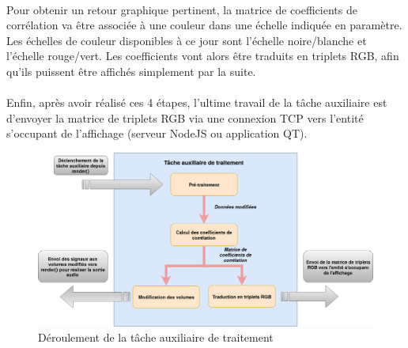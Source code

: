 \paragraph{}
Pour obtenir un retour graphique pertinent, la matrice de coefficients de corrélation va être associée à une couleur dans une échelle indiquée en paramètre. Les échelles de couleur disponibles à ce jour sont l'échelle noire/blanche et l'échelle rouge/vert. Les coefficients vont alors être traduits en triplets RGB, afin qu'ils puissent être affichés simplement par la suite.
\paragraph{}
Enfin, après avoir réalisé ces 4 étapes, l'ultime travail de la tâche auxiliaire est d'envoyer la matrice de triplets RGB via une connexion TCP vers l'entité s'occupant de l'affichage (serveur NodeJS ou application QT).
\begin{figure}[H]
    \centering
    \includegraphics[scale=0.45]{assets/auxtask.png}
    \caption{Déroulement de la tâche auxiliaire de traitement}
    \label{aux task}
\end{figure}
